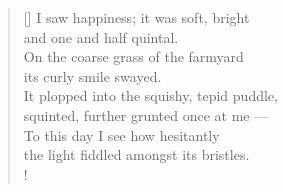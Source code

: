 \documentclass[a4paper,12pt,twoside,final]{book}
\begin{document}
\newpage


\settowidth{\versewidth}{It plopped into the squishy, tepid puddle,}

\begin{verse}[\versewidth]
  I saw happiness; it was soft, bright \\
  and one and half quintal. \\
  On the coarse grass of the farmyard \\
  its curly smile swayed. \\
  It plopped into the squishy, tepid puddle, \\
  squinted, further grunted once at me --- \\
  To this day I see how hesitantly \\
  the light fiddled amongst its bristles. \\!
\end{verse}


\newpage

\settowidth{\versewidth}{hunyorgott, röffent még felém ---}
\end{document}
